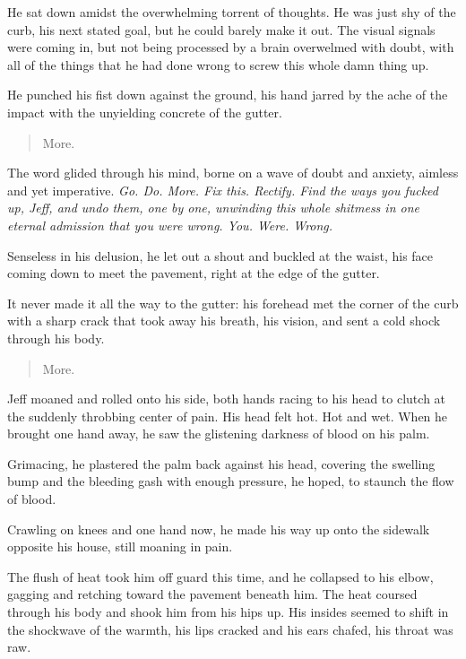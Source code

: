 He sat down amidst the overwhelming torrent of thoughts.  He was just shy of the curb, his next stated goal, but he could barely make it out.  The visual signals were coming in, but not being processed by a brain overwelmed with doubt, with all of the things that he had done wrong to screw this whole damn thing up.

He punched his fist down against the ground, his hand jarred by the ache of the impact with the unyielding concrete of the gutter.

\begin{quote}
  More.
\end{quote}

The word glided through his mind, borne on a wave of doubt and anxiety, aimless and yet imperative.  \textit{Go.  Do.  More.  Fix this.  Rectify.  Find the ways you fucked up, Jeff, and undo them, one by one, unwinding this whole shitmess in one eternal admission that you were wrong.  You.  Were.  Wrong.}

Senseless in his delusion, he let out a shout and buckled at the waist, his face coming down to meet the pavement, right at the edge of the gutter.

It never made it all the way to the gutter: his forehead met the corner of the curb with a sharp crack that took away his breath, his vision, and sent a cold shock through his body.

\begin{quote}
  More.
\end{quote}

Jeff moaned and rolled onto his side, both hands racing to his head to clutch at the suddenly throbbing center of pain.  His head felt hot.  Hot and wet.  When he brought one hand away, he saw the glistening darkness of blood on his palm.

Grimacing, he plastered the palm back against his head, covering the swelling bump and the bleeding gash with enough pressure, he hoped, to staunch the flow of blood.

Crawling on knees and one hand now, he made his way up onto the sidewalk opposite his house, still moaning in pain.

The flush of heat took him off guard this time, and he collapsed to his elbow, gagging and retching toward the pavement beneath him.  The heat coursed through his body and shook him from his hips up.  His insides seemed to shift in the shockwave of the warmth, his lips cracked and his ears chafed, his throat was raw.


